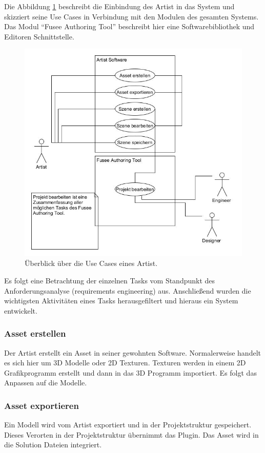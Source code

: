\documentclass[pagesize, paper=a4, fontsize=12pt, titlepage=true, headings=small, headnosepline, abstractoff, liststotoc, nochapterprefix, plainheadsepline, twoside]{scrreprt}
\begin{document}
Die Abbildung \ref{UseCaseArtist} beschreibt die Einbindung des Artist in das System und skizziert seine Use Cases in Verbindung mit den Modulen des gesamten Systems. Das Modul “Fusee Authoring Tool” beschreibt hier eine Softwarebibliothek und Editoren Schnittstelle.
\begin{figure}[ht]
	\centering
	\includegraphics[width=\linewidth]{Bilder/UseCase_Artist.jpg}
	\caption{Überblick über die Use Cases eines Artist.}
	\label{UseCaseArtist}
\end{figure}

Es folgt eine Betrachtung der einzelnen Tasks vom Standpunkt des Anforderungsanalyse (requirements engineering) aus. Anschließend wurden die wichtigsten Aktivitäten eines Tasks herausgefiltert und hieraus ein System entwickelt.

\subsubsection{Asset erstellen}
Der Artist erstellt ein Asset in seiner gewohnten Software. Normalerweise handelt es sich hier um 3D Modelle oder 2D Texturen. Texturen werden in einem 2D Grafikprogramm erstellt und dann in das 3D Programm importiert. Es folgt das Anpassen auf die Modelle.

\subsubsection{Asset exportieren}
Ein Modell wird vom Artist exportiert und in der Projektstruktur gespeichert. Dieses Verorten in der Projektstruktur übernimmt das Plugin. Das Asset wird in die Solution Dateien integriert.
\end{document}
